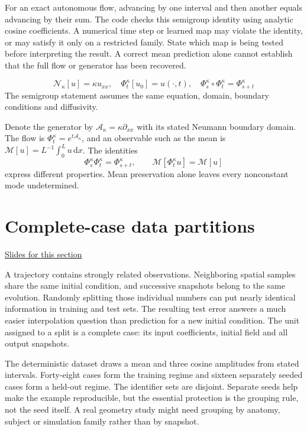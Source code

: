 \documentclass[11pt,letterpaper]{article}
\theoremstyle{definition}\newtheorem{definition}{Definition}\newtheorem{example}{Example}
\numberwithin{equation}{section}
\begin{document}
For an exact autonomous flow, advancing by one interval and then another equals advancing by their sum. The code checks this semigroup identity using analytic cosine coefficients. A numerical time step or learned map may violate the identity, or may satisfy it only on a restricted family. State which map is being tested before interpreting the result. A correct mean prediction alone cannot establish that the full flow or generator has been recovered.

\[
\mathcal N_\kappa[u]=\kappa u_{xx},\quad\Phi_t^\kappa[u_0]=u(\cdot,t),\quad\Phi_s^\kappa\circ\Phi_t^\kappa=\Phi_{s+t}^\kappa
\]
The semigroup statement assumes the same equation, domain, boundary conditions and diffusivity.

Denote the generator by $\mathcal A_\kappa=\kappa\partial_{xx}$ with its stated Neumann boundary domain. The flow is $\Phi_t^\kappa=e^{t\mathcal A_\kappa}$, and an observable such as the mean is $\mathcal M[u]=L^{-1}\int_0^Lu\,\mathrm dx$. The identities
\[
 \Phi_s^\kappa\Phi_t^\kappa=\Phi_{s+t}^\kappa,
 \qquad\mathcal M[\Phi_t^\kappa u]=\mathcal M[u]
\]
express different properties. Mean preservation alone leaves every nonconstant mode undetermined.
\section{Complete-case data partitions}
\hypertarget{note-complete-case-data-partitions}{}\label{note:complete-case-data-partitions}
{\small \href{slides.html\#frame=split-complete-evolution-cases-panel-1\&step=1}{Slides for this section}}\par
A trajectory contains strongly related observations. Neighboring spatial samples share the same initial condition, and successive snapshots belong to the same evolution. Randomly splitting those individual numbers can put nearly identical information in training and test sets. The resulting test error answers a much easier interpolation question than prediction for a new initial condition. The unit assigned to a split is a complete case: its input coefficients, initial field and all output snapshots.

The deterministic dataset draws a mean and three cosine amplitudes from stated intervals. Forty-eight cases form the training regime and sixteen separately seeded cases form a held-out regime. The identifier sets are disjoint. Separate seeds help make the example reproducible, but the essential protection is the grouping rule, not the seed itself. A real geometry study might need grouping by anatomy, subject or simulation family rather than by snapshot.
\end{document}
